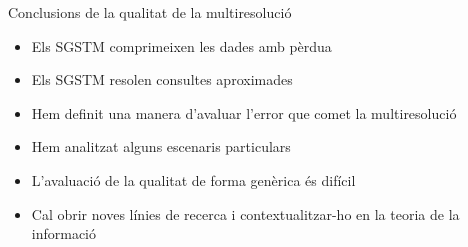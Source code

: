 \begin{frame}{Conclusions de la qualitat de la multiresolució}

  \begin{itemize}
  \item Els SGSTM comprimeixen les dades amb pèrdua
  \item Els SGSTM resolen consultes aproximades
  \item Hem definit una manera d’avaluar l’error que comet la multiresolució
  \item Hem analitzat alguns escenaris particulars
  \item L’avaluació de la qualitat de forma genèrica és difícil
  \item Cal obrir noves línies de recerca i contextualitzar-ho en la teoria de la informació
  \end{itemize}
\end{frame}


